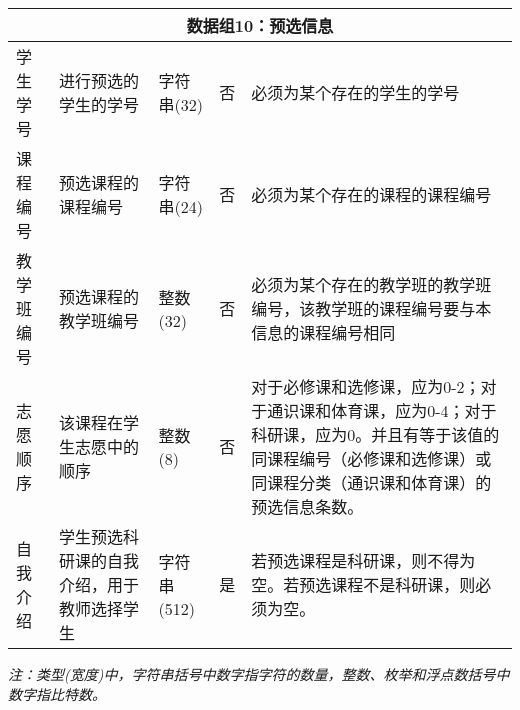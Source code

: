 \begin{center}
\begin{longtable}{p{6em}p{16em}p{8em}@{}p{2em}p{16em}}
        \multicolumn{5}{c}{\textbf{数据组10：预选信息}} \\
        \midrule
        学生学号 & 进行预选的学生的学号 & 字符串(32) & 否 & 必须为某个存在的学生的学号 \\
        课程编号 & 预选课程的课程编号 & 字符串(24) & 否 & 必须为某个存在的课程的课程编号 \\
        教学班编号 & 预选课程的教学班编号 & 整数(32) & 否 & 必须为某个存在的教学班的教学班编号，该教学班的课程编号要与本信息的课程编号相同 \\
        志愿顺序 & 该课程在学生志愿中的顺序 & 整数(8) & 否 & 对于必修课和选修课，应为0-2；对于通识课和体育课，应为0-4；对于科研课，应为0。并且有等于该值的同课程编号（必修课和选修课）或同课程分类（通识课和体育课）的预选信息条数。\\
        自我介绍 & 学生预选科研课的自我介绍，用于教师选择学生 & 字符串(512) & 是 & 若预选课程是科研课，则不得为空。若预选课程不是科研课，则必须为空。 \\
    \end{longtable}
    \textit{注：类型(宽度)中，字符串括号中数字指字符的数量，整数、枚举和浮点数括号中数字指比特数。}
\end{center}

